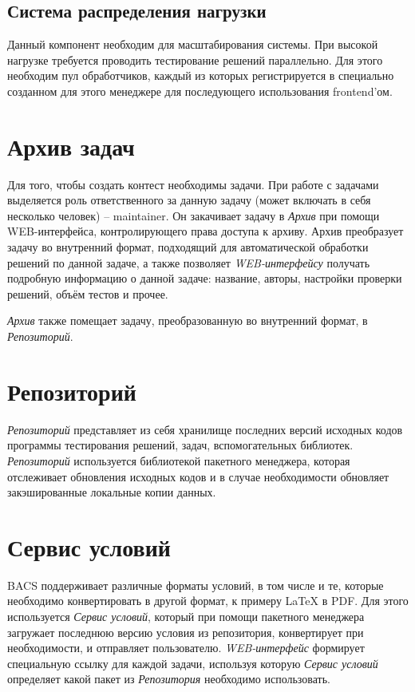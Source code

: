 \subsection{Система распределения нагрузки}
Данный компонент необходим для масштабирования системы.
При высокой нагрузке требуется проводить тестирование решений параллельно.
Для этого необходим пул обработчиков, каждый из которых регистрируется в специально
созданном для этого менеджере для последующего использования frontend'ом.

\section{Архив задач}
Для того, чтобы создать контест необходимы задачи.
При работе с задачами выделяется роль ответственного за данную задачу (может включать в себя
несколько человек) -- maintainer. Он закачивает задачу в \textit{Архив} при помощи WEB-интерфейса,
контролирующего права доступа к архиву. Архив преобразует задачу во внутренний формат,
подходящий для автоматической обработки решений по данной задаче, а также позволяет
\textit{WEB-интерфейсу} получать подробную информацию о данной задаче:
название, авторы, настройки проверки решений, объём тестов и прочее.

\textit{Архив} также помещает задачу, преобразованную во внутренний формат, в \textit{Репозиторий}.

\section{Репозиторий}
\textit{Репозиторий} представляет из себя хранилище последних версий исходных кодов
программы тестирования решений, задач, вспомогательных библиотек.
\textit{Репозиторий} используется библиотекой пакетного менеджера,
которая отслеживает обновления исходных кодов и в случае необходимости
обновляет закэшированные локальные копии данных.

\section{Сервис условий}
BACS поддерживает различные форматы условий, в том числе и те, которые необходимо
конвертировать в другой формат, к примеру LaTeX в PDF. Для этого используется
\textit{Сервис условий}, который при помощи пакетного менеджера загружает последнюю
версию условия из репозитория, конвертирует при необходимости,
и отправляет пользователю. \textit{WEB-интерфейс} формирует специальную ссылку
для каждой задачи, используя которую \textit{Сервис условий} определяет
какой пакет из \textit{Репозитория} необходимо использовать.

